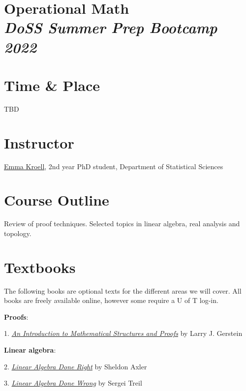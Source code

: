 \documentclass[12pt]{article}
\date{ }
\begin{document}
\section*{Operational Math\\  {\it{DoSS Summer Prep Bootcamp 2022}}}

\section{Time \& Place}
TBD

\section{Instructor}
\href{https://www.statistics.utoronto.ca/people/directories/graduate-students/emma-kroell}{Emma Kroell}, 2nd year PhD student, Department of Statistical Sciences


\section{Course Outline}
Review of proof techniques. Selected topics in linear algebra, real analysis and topology.

\section{Textbooks}
The following books are optional texts for the different areas we will cover. All books are freely available online, however some require a U of T log-in.

\vspace{1em}

\noindent
{\bf{Proofs}}:

1. \href{https://link-springer-com.myaccess.library.utoronto.ca/book/10.1007/978-1-4614-4265-3}{{\emph{An Introduction to Mathematical Structures and Proofs}}} by Larry J. Gerstein

\vspace{1em}

\noindent
{\bf{Linear algebra}}:

\vspace{0.1cm}

2. \href{https://link-springer-com.myaccess.library.utoronto.ca/book/10.1007/978-3-319-11080-6}{{\emph{Linear Algebra Done Right}}} by Sheldon Axler

3. \href{https://www.math.brown.edu/streil/papers/LADW/LADW.html}{{\emph{Linear Algebra Done Wrong}}} by Sergei Treil
\end{document}
